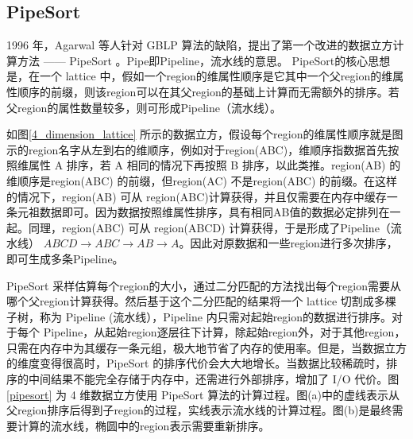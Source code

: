 

\subsection{PipeSort}

1996 年，Agarwal 等人针对 GBLP  \cite{gray1997data} 算法的缺陷，提出了第一个改进的数据立方计算方法 —— PipeSort\cite{agarwal1996computation} 。Pipe即Pipeline，流水线的意思。
PipeSort的核心思想是，在一个 lattice 中，假如一个region的维属性顺序是它其中一个父region的维属性顺序的前缀，则该region可以在其父region的基础上计算而无需额外的排序。若父region的属性数量较多，则可形成Pipeline（流水线）。

如图\ref{4_dimension_lattice} 所示的数据立方，假设每个region的维属性顺序就是图示的region名字从左到右的维顺序，例如对于region(ABC)，维顺序指数据首先按照维属性 A 排序，若 A 相同的情况下再按照 B 排序，以此类推。region(AB) 的维顺序是region(ABC) 的前缀，但region(AC) 不是region(ABC) 的前缀。在这样的情况下，region(AB) 可从 region(ABC)计算获得，并且仅需要在内存中缓存一条元祖数据即可。因为数据按照维属性排序，具有相同AB值的数据必定排列在一起。同理，region(ABC) 可从 region(ABCD) 计算获得，于是形成了Pipeline（流水线） $ABCD\rightarrow ABC\rightarrow AB\rightarrow A$。因此对原数据和一些region进行多次排序，即可生成多条Pipeline。

PipeSort 采样估算每个region的大小，通过二分匹配的方法找出每个region需要从哪个父region计算获得。然后基于这个二分匹配的结果将一个 lattice 切割成多棵子树，称为 Pipeline (流水线），Pipeline 内只需对起始region的数据进行排序。对于每个 Pipeline，从起始region逐层往下计算，除起始region外，对于其他region，只需在内存中为其缓存一条元组，极大地节省了内存的使用率。但是，当数据立方的维度变得很高时，PipeSort 的排序代价会大大地增长。当数据比较稀疏时，排序的中间结果不能完全存储于内存中，还需进行外部排序，增加了 I/O 代价。图\ref{pipesort} 为 4 维数据立方使用 PipeSort 算法的计算过程。图(a)中的虚线表示从父region排序后得到子region的过程，实线表示流水线的计算过程。图(b)是最终需要计算的流水线，椭圆中的region表示需要重新排序。


